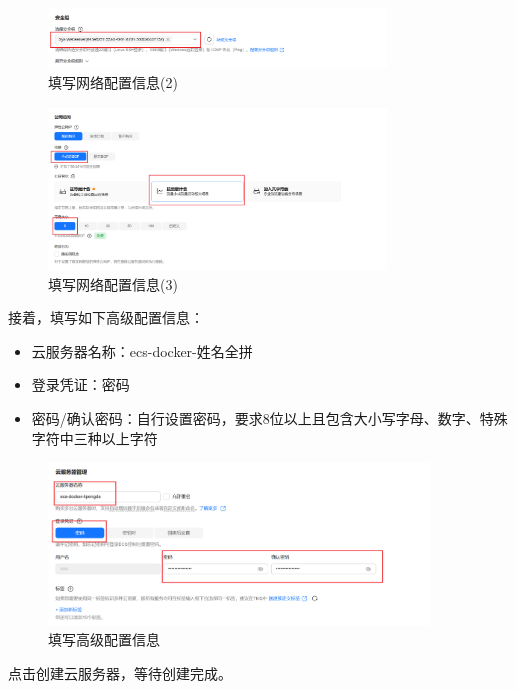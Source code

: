 \documentclass{article}
\begin{document}
\begin{figure}[H]
\centering
\includegraphics[width=0.8\textwidth]{img/1.4.6.png}
\caption{填写网络配置信息(2)}
\end{figure}

\begin{figure}[H]
\centering
\includegraphics[width=0.8\textwidth]{img/1.4.7.png}
\caption{填写网络配置信息(3)}
\end{figure}

接着，填写如下高级配置信息：


\begin{itemize}[noitemsep]
    \item 云服务器名称：ecs-docker-姓名全拼
    \item 登录凭证：密码
    \item 密码/确认密码：自行设置密码，要求8位以上且包含大小写字母、数字、特殊字符中三种以上字符
\end{itemize}

\begin{figure}[H]
\centering
\includegraphics[width=0.9\textwidth]{img/1.4.8.png}
\caption{填写高级配置信息}
\end{figure}

点击创建云服务器，等待创建完成。
\end{document}
